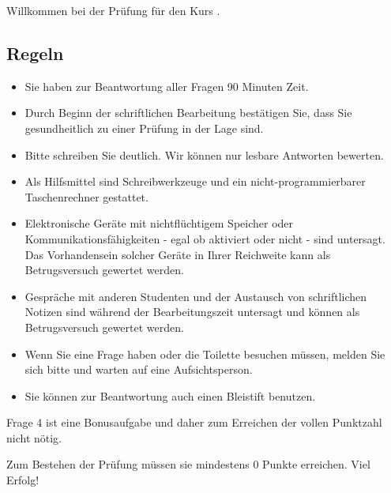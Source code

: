 \documentclass[addpoints,answers]{exam}				%
\begin{document}


Willkommen bei der Prüfung für den Kurs {\textbf \coursename}.

\subsection*{Regeln}

\begin{itemize}
\item Sie haben zur Beantwortung aller Fragen 90 Minuten Zeit.
\item Durch Beginn der schriftlichen Bearbeitung bestätigen Sie, dass Sie gesundheitlich zu einer Prüfung in der Lage sind.
\item Bitte schreiben Sie deutlich. Wir können nur lesbare Antworten bewerten.
\item Als Hilfsmittel sind Schreibwerkzeuge und ein nicht-programmierbarer Taschenrechner gestattet.
\item Elektronische Geräte mit nichtflüchtigem Speicher oder Kommunikationsfähigkeiten - egal ob aktiviert oder nicht - sind untersagt. Das Vorhandensein solcher Geräte in Ihrer Reichweite kann als Betrugsversuch gewertet werden.
\item Gespräche mit anderen Studenten und der Austausch von schriftlichen Notizen sind während der Bearbeitungszeit untersagt und können als Betrugsversuch gewertet werden.
\item Wenn Sie eine Frage haben oder die Toilette besuchen müssen, melden Sie sich bitte und warten auf eine Aufsichtsperson.
\item Sie können zur Beantwortung auch einen Bleistift benutzen.
\end{itemize}

Frage 4 ist eine Bonusaufgabe und daher zum Erreichen der vollen Punktzahl nicht nötig.

Zum Bestehen der Prüfung müssen sie mindestens 0 Punkte erreichen. Viel Erfolg!
\\\\
\begin{center}
\combinedgradetable[h]
\end{center}
\pagebreak

\begin{questions}




\end{questions}

\end{document}
